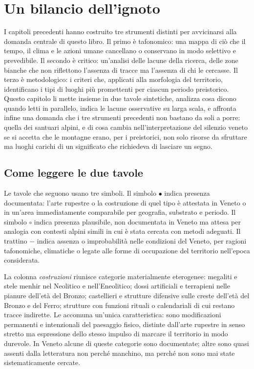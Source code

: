 \chapter{Un bilancio dell'ignoto}
\label{cap:bilancio}

I capitoli precedenti hanno costruito tre strumenti distinti per avvicinarsi alla domanda centrale di questo libro. Il primo è tafonomico: una mappa di ciò che il tempo, il clima e le azioni umane cancellano o conservano in modo selettivo e prevedibile. Il secondo è critico: un'analisi delle lacune della ricerca, delle zone bianche che non riflettono l'assenza di tracce ma l'assenza di chi le cercasse. Il terzo è metodologico: i criteri che, applicati alla morfologia del territorio, identificano i tipi di luoghi più promettenti per ciascun periodo preistorico. Questo capitolo li mette insieme in due tavole sintetiche, analizza cosa dicono quando letti in parallelo, indica le lacune osservative su larga scala, e affronta infine una domanda che i tre strumenti precedenti non bastano da soli a porre: quella dei santuari alpini, e di cosa cambia nell'interpretazione del silenzio veneto se si accetta che le montagne erano, per i preistorici, non solo risorse da sfruttare ma luoghi carichi di un significato che richiedeva di lasciare un segno.

\section{Come leggere le due tavole}

Le tavole che seguono usano tre simboli. Il simbolo $\bullet$ indica presenza documentata: l'arte rupestre o la costruzione di quel tipo è attestata in Veneto o in un'area immediatamente comparabile per geografia, substrato e periodo. Il simbolo $\circ$ indica presenza plausibile, non documentata in Veneto ma attesa per analogia con contesti alpini simili in cui è stata cercata con metodi adeguati. Il trattino $-$ indica assenza o improbabilità nelle condizioni del Veneto, per ragioni tafonomiche, climatiche o legate alle forme di occupazione del territorio nell'epoca considerata.

La colonna \emph{costruzioni} riunisce categorie materialmente eterogenee: megaliti e stele menhir nel Neolitico e nell'Eneolitico; dossi artificiali e terrapieni nelle pianure dell'età del Bronzo; castellieri e strutture difensive sulle creste dell'età del Bronzo e del Ferro; strutture con funzioni rituali o calendariali di cui restano tracce indirette. Le accomuna un'unica caratteristica: sono modificazioni permanenti e intenzionali del paesaggio fisico, distinte dall'arte rupestre in senso stretto ma espressione dello stesso impulso di marcare il territorio in modo durevole. In Veneto alcune di queste categorie sono documentate; altre sono quasi assenti dalla letteratura non perché manchino, ma perché non sono mai state sistematicamente cercate.

